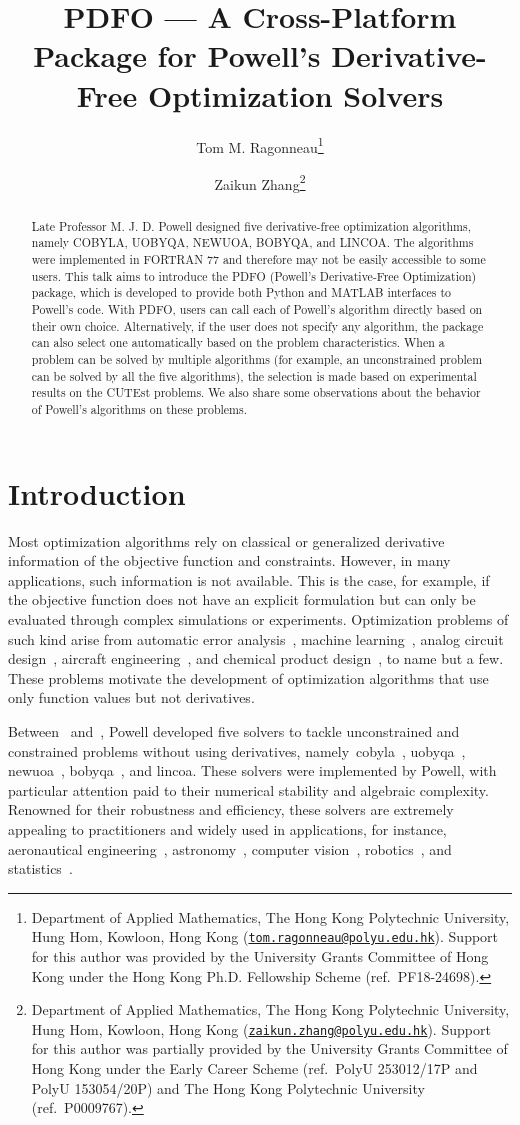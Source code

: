 \documentclass[11pt,draft]{article}
\title{PDFO --- A Cross-Platform Package for Powell's Derivative-Free Optimization Solvers}
\author{
    Tom M. Ragonneau\thanks{
        Department of Applied Mathematics, The Hong Kong Polytechnic University, Hung Hom, Kowloon, Hong Kong (\href{mailto:tom.ragonneau@polyu.edu.hk}{\texttt{tom.ragonneau@polyu.edu.hk}}).
        Support for this author was provided by the University Grants Committee of Hong Kong under the Hong Kong Ph.D. Fellowship Scheme (ref.\ PF18-24698).
    }
    \and Zaikun Zhang\thanks{
        Department of Applied Mathematics, The Hong Kong Polytechnic University, Hung Hom, Kowloon, Hong Kong (\href{mailto:zaikun.zhang@polyu.edu.hk}{\texttt{zaikun.zhang@polyu.edu.hk}}).
        Support for this author was partially provided by the University Grants Committee of Hong Kong under the Early Career Scheme (ref.\ PolyU 253012/17P and PolyU 153054/20P) and The Hong Kong Polytechnic University (ref.\ P0009767).
    }
}
\numberwithin{equation}{section}
\begin{document}
\maketitle

\begin{abstract}
    Late Professor M. J. D. Powell designed five derivative-free optimization algorithms, namely COBYLA, UOBYQA, NEWUOA, BOBYQA, and LINCOA. The algorithms were implemented in FORTRAN 77 and therefore may not be easily accessible to some users. This talk aims to introduce the PDFO (Powell’s Derivative-Free Optimization) package, which is developed to provide both Python and MATLAB interfaces to Powell's code. With PDFO, users can call each of Powell's algorithm directly based on their own choice. Alternatively, if the user does not specify any algorithm, the package can also select one automatically based on the problem characteristics. When a problem can be solved by multiple algorithms (for example, an unconstrained problem can be solved by all the five algorithms), the selection is made based on experimental results on the CUTEst problems.
    We also share some observations about the behavior of Powell's algorithms on these problems.
\end{abstract}

\section{Introduction}

Most optimization algorithms rely on classical or generalized derivative information of the objective function and constraints.
However, in many applications, such information is not available.
This is the case, for example, if the objective function does not have an explicit formulation but can only be evaluated through complex simulations or experiments.
Optimization problems of such kind arise from automatic error analysis~\cite{Higham_1993,Higham_2002}, machine learning~\cite{Ghanbari_Scheinberg_2017}, analog circuit design~\cite{Latorre_Etal_2019}, aircraft engineering~\cite{Gazaix_Etal_2019}, and chemical product design~\cite{Sun_Etal_2020}, to name but a few.
These problems motivate the development of optimization algorithms that use only function values but not derivatives.

Between~\citeyear{Powell_1994} and~\citeyear{Powell_2015}, Powell developed five solvers to tackle unconstrained and constrained problems without using derivatives,
namely~\gls{cobyla}~\cite{Powell_1994}, \gls{uobyqa}~\cite{Powell_2002}, \gls{newuoa}~\cite{Powell_2006}, \gls{bobyqa}~\cite{Powell_2009}, and \gls{lincoa}.
These solvers were implemented by Powell, with particular attention paid to their numerical stability and algebraic complexity.
Renowned for their robustness and efficiency, these solvers are extremely appealing to practitioners and widely used in applications, for instance, aeronautical engineering~\cite{Gallard_Etal_2018}, astronomy~\cite{Biviano_Etal_2013,Mamon_Biviano_Boue_2013}, computer vision~\cite{Izadinia_Shan_Seitz_2017}, robotics~\cite{Mombaur_Truong_Laumond_2010}, and statistics~\cite{Bates_Etal_2015}.
\end{document}
